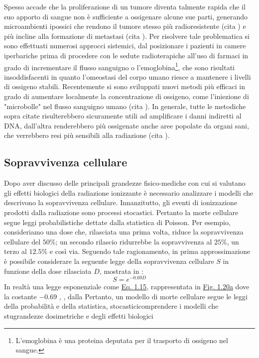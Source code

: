 \documentclass[12pt,a4paper,twoside]{report}
\begin{document}
	 Spesso accade che la proliferazione di un tumore diventa talmente rapida che il suo apporto di sangue non è sufficiente a ossigenare alcune sue parti, generando microambienti ipossici che rendono il tumore stesso più radioresistente (cita
	 ) e più incline alla formazione di metastasi (cita
	 ). Per risolvere tale problematica si sono effettuati numerosi approcci sistemici, dal posizionare i pazienti in camere iperbariche prima di procedere con le sedute radioterapiche all'uso di farmaci in grado di incrementare il flusso sanguigno o l'emoglobina\footnote{L'emoglobina è una proteina deputata per il trasporto di ossigeno nel sangue.}, che sono risultati insoddisfacenti in quanto l'omeostasi del corpo umano riesce a mantenere i livelli di ossigeno stabili. Recentemente si sono sviluppati nuovi metodi più efficaci in grado di aumentare localmente la concentrazione di ossigeno, come l'iniezione di "microbolle" nel flusso sanguigno umano (cita
	 ). In generale, tutte le metodiche sopra citate risulterebbero sicuramente utili ad amplificare i danni indiretti al DNA, dall'altra renderebbero più ossigenate anche aree popolate da organi sani, che verrebbero resi più sensibili alla radiazione (cita
	 ).
	
	\subsection{Sopravvivenza cellulare}
	Dopo aver discusso delle principali grandezze fisico-mediche con cui si valutano gli effetti biologici della radiazione ionizzante è necessario analizzare i modelli che descrivono la sopravvivenza cellulare. Innanzitutto, gli eventi di ionizzazione prodotti dalla radiazione sono processi stocastici. Pertanto la morte cellulare segue leggi probabilistiche dettate dalla statistica di Poisson. Per esempio, consideriamo una dose che, rilasciata una prima volta, riduce la sopravvivenza cellulare del $50\%$; un secondo rilascio ridurrebbe la sopravvivenza al $25\%$, un terzo al $12.5\%$ e così via. Seguendo tale ragionamento, in prima approssimazione è possibile considerare la seguente legge della sopravvivenza cellulare $S$ in funzione della dose rilasciata $D$, mostrata in :
	\begin{equation}
		S=e^{-0.69D}
		\label{eq:survival}
	\end{equation}
	In realtà una legge esponenziale come \hyperref[eq:survival]{Eq. 1.15}, rappresentata in \hyperref[fig:survival1]{Fig. 1.20a} dove la costante $-0.69$ ,  ,  dalla  Pertanto, un modello di morte cellulare segue le leggi della probabilità e della statistica,  stocasticicomprendere i modelli che stugrandezze dosimetriche e degli effetti biologici
	
\end{document}
